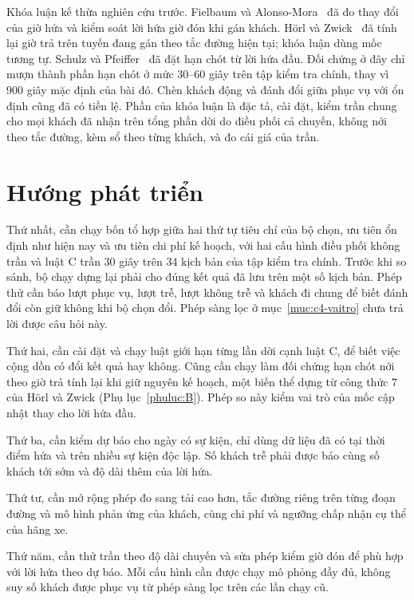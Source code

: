 Khóa luận kế thừa nghiên cứu trước. Fielbaum và Alonso-Mora~\cite{fielbaum2020} đã đo thay đổi của giờ hứa và kiểm soát lời hứa giờ đón khi gán khách. Hörl và Zwick~\cite{horl2022} đã tính lại giờ trả trên tuyến đang gán theo tắc đường hiện tại; khóa luận dùng mốc tương tự. Schulz và Pfeiffer~\cite{schulz2026} đã đặt hạn chót từ lời hứa đầu. Đối chứng ở đây chỉ mượn thành phần hạn chót ở mức 30--60 giây trên tập kiểm tra chính, thay vì 900 giây mặc định của bài đó. Chèn khách động và đánh đổi giữa phục vụ với ổn định cũng đã có tiền lệ. Phần của khóa luận là đặc tả, cài đặt, kiểm trần chung cho mọi khách đã nhận trên tổng phần dời do điều phối cả chuyến, không nới theo tắc đường, kèm sổ theo từng khách, và đo cái giá của trần.

\section{Hướng phát triển}
\label{muc:c5-huongphattrien}

Thứ nhất, cần chạy bốn tổ hợp giữa hai thứ tự tiêu chí của bộ chọn, ưu tiên ổn định như hiện nay và ưu tiên chi phí kế hoạch, với hai cấu hình điều phối không trần và luật C trần 30 giây trên 34 kịch bản của tập kiểm tra chính. Trước khi so sánh, bộ chạy dựng lại phải cho đúng kết quả đã lưu trên một số kịch bản. Phép thử cần báo lượt phục vụ, lượt trễ, lượt không trễ và khách đi chung để biết đánh đổi còn giữ không khi bộ chọn đổi. Phép sàng lọc ở mục~\ref{muc:c4-vaitro} chưa trả lời được câu hỏi này.

Thứ hai, cần cài đặt và chạy luật giới hạn từng lần dời cạnh luật C, để biết việc cộng dồn có đổi kết quả hay không. Cũng cần chạy làm đối chứng hạn chót nới theo giờ trả tính lại khi giữ nguyên kế hoạch, một biến thể dựng từ công thức 7 của Hörl và Zwick (Phụ lục~\ref{phuluc:B}). Phép so này kiểm vai trò của mốc cập nhật thay cho lời hứa đầu.

Thứ ba, cần kiểm dự báo cho ngày có sự kiện, chỉ dùng dữ liệu đã có tại thời điểm hứa và trên nhiều sự kiện độc lập. Số khách trễ phải được báo cùng số khách tới sớm và độ dài thêm của lời hứa.

Thứ tư, cần mở rộng phép đo sang tải cao hơn, tắc đường riêng trên từng đoạn đường và mô hình phản ứng của khách, cùng chi phí và ngưỡng chấp nhận cụ thể của hãng xe.

Thứ năm, cần thử trần theo độ dài chuyến và sửa phép kiểm giờ đón để phù hợp với lời hứa theo dự báo. Mỗi cấu hình cần được chạy mô phỏng đầy đủ, không suy số khách được phục vụ từ phép sàng lọc trên các lần chạy cũ.
